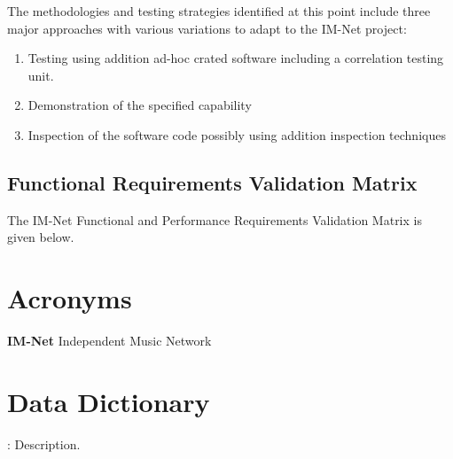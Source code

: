 \documentclass[letterpaper]{article}
\begin{document}
The methodologies and testing strategies identified at this point include three major approaches with various variations to adapt to the IM-Net project:

\begin{enumerate}
\item  Testing using addition ad-hoc crated software including a correlation testing unit.

\item  Demonstration of the specified capability

\item  Inspection of the software code possibly using addition inspection techniques
\end{enumerate}

 
\subsection{Functional Requirements Validation Matrix}
The IM-Net Functional and Performance Requirements Validation Matrix is given below.
\eject 
 
\section{Acronyms}
\textbf{IM-Net}  Independent Music Network

\eject 
 
\section{Data Dictionary}

: Description. 
\end{document}
